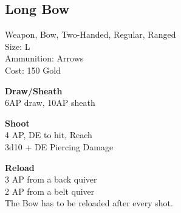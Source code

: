 \subsection{Long Bow}\label{weapon:longBow}
Weapon, Bow, Two-Handed, Regular, Ranged\\
Size: L\\
Ammunition: Arrows\\
Cost: 150 Gold

\textbf{Draw/Sheath}\\
6AP draw, 10AP sheath

\textbf{Shoot}\\
4 AP, DE to hit,  Reach\\
3d10 + \texttimes DE Piercing Damage

\textbf{Reload}\\
3 AP from a back quiver\\
2 AP from a belt quiver\\
The Bow has to be reloaded after every shot.